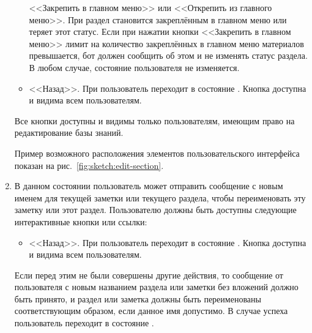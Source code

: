 \begin{enumerate}
\begin{itemize}
                    <<Закрепить в главном меню>> или <<Открепить из главного меню>>.
                    При  раздел становится закреплённым в главном меню или теряет этот
                    статус. Если при нажатии кнопки <<Закрепить в главном меню>> лимит на количество
                    закреплённых в главном меню материалов превышается, бот должен сообщить об
                    этом и не изменять статус раздела. В любом случае, состояние пользователя
                    не изменяется.
                \item
                    <<Назад>>.
                    При  пользователь переходит в состояние
                    \hyperref[itm:req:ui:states:navx]
                    {}.
                    Кнопка доступна и видима всем пользователям.
            \end{itemize}

            Все кнопки доступны и видимы только пользователям, имеющим право на редактирование
            базы знаний.

            Пример возможного расположения элементов пользовательского интерфейса показан на
            рис.~\ref{fig:sketch:edit-section}.

        \item \label{itm:req:ui:states:rename-kbo}

            В данном состоянии пользователь может отправить сообщение с новым именем для
            текущей заметки или текущего раздела, чтобы переименовать эту заметку или этот раздел.
            Пользователю должны быть доступны следующие интерактивные кнопки или ссылки:
            \begin{itemize}
                \item
                    <<Назад>>.
                    При  пользователь переходит в состояние
                    \hyperref[itm:req:ui:states:navx]
                    {}.
                    Кнопка доступна и видима всем пользователям.
            \end{itemize}
            Если перед этим не были совершены другие действия, то сообщение от пользователя
            с новым названием раздела или заметки без вложений должно быть принято,
            и раздел или заметка должны быть переименованы соответствующим образом,
            если данное имя допустимо.
            В случае успеха пользователь переходит в состояние
            \hyperref[itm:req:ui:states:navx]
            {}.


\end{enumerate}
